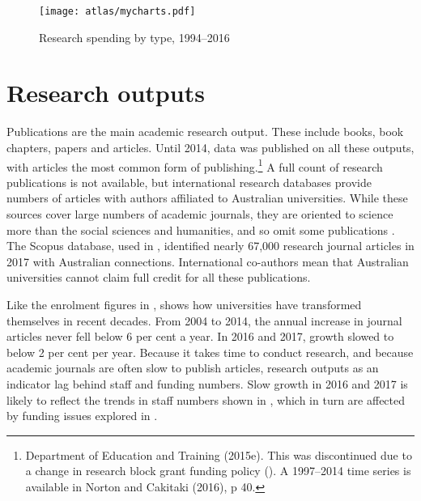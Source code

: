 \documentclass{grattan}
\begin{document}
    \begin{figure} %
    \caption{Research spending by type, 1994--2016}\label{fig:research-spending-by-type-19942016}
    \texttt{[image: atlas/mycharts.pdf]}
    \end{figure}

%
\section{Research outputs}\label{sec:research-outputs}

Publications are the main academic research output. These include books, book chapters, papers and articles. Until 2014, data was published on all these outputs, with articles the most common form of publishing.\footnote{Department of Education and Training (2015e). This was discontinued due to a change in research block grant funding policy (). A 1997--2014 time series is available in Norton and Cakitaki (2016), p 40.} A full count of research publications is not available, but international research databases provide numbers of articles with authors affiliated to Australian universities. While these sources cover large numbers of academic journals, they are oriented to science more than the social sciences and humanities, and so omit some publications . The Scopus database, used in , identified nearly 67,000 research journal articles in 2017 with Australian connections. International co-authors mean that Australian universities cannot claim full credit for all these publications.

Like the enrolment figures in ,  shows how universities have transformed themselves in recent decades. From 2004 to 2014, the annual increase in journal articles never fell below 6 per cent a year. In 2016 and 2017, growth slowed to below 2 per cent per year. Because it takes time to conduct research, and because academic journals are often slow to publish articles, research outputs as an indicator lag behind staff and funding numbers. Slow growth in 2016 and 2017 is likely to reflect the trends in staff numbers shown in , which in turn are affected by funding issues explored in .
\end{document}

